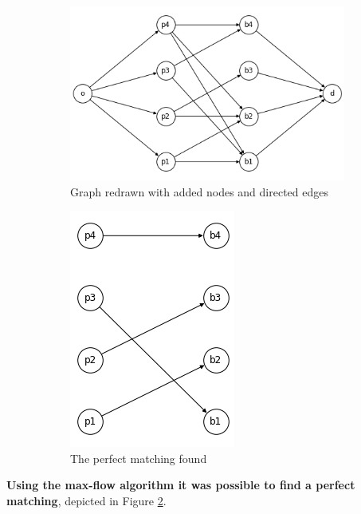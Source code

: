 \documentclass[
	12pt, %
]{fphw}
\begin{document}
\begin{enumerate}[{\bfseries (a)}]
    \begin{figure}[H]
    \centering
        \begin{subfigure}{.5\textwidth}
            \centering
            \includegraphics[width=1\linewidth]{2b(1).png}
            \caption{Graph redrawn with added nodes and directed edges}
            \label{fig:graph2B(a)}
        \end{subfigure}%
        \begin{subfigure}{.5\textwidth}
            \centering
            \includegraphics[width=0.5\linewidth]{2b.png}
            \caption{The perfect matching found}
            \label{fig:graph2B(b)}
        \end{subfigure}
        \caption{}
        \label{fig:figEx2b}
    \end{figure}
    \textbf{Using the max-flow algorithm it was possible to find a perfect matching}, depicted in Figure \ref{fig:graph2B(b)}. 
    

\end{enumerate}
\end{document}
